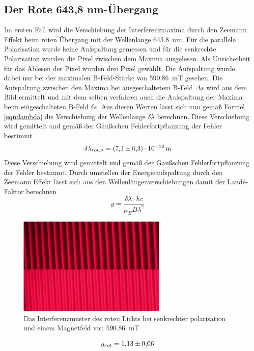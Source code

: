 \subsection{Der Rote 643,8 nm-Übergang}
Im ersten Fall wird die Verschiebung der Interferenzmaxima durch den Zeemann Effekt beim roten Übergang mit der Wellenlänge \SI{643,8}{\nano\metre}.
Für die parallele Polarisation wurde keine Aufspaltung gemessen und für die senkrechte Polarisation wurden die Pixel zwischen dem Maxima ausgelesen.
Als Unsicherheit für das Ablesen der Pixel wurden drei Pixel gewählt.
Die Aufspaltung wurde dabei nur bei der maximalen B-Feld-Stärke von \SI{590,86}{\milli\tesla} gesehen.
Die Aufspaltung zwischen den Maxima bei ausgeschaltetem B-Feld $\Delta s$ wird aus dem Bild ermittelt und mit dem selben verfahren auch die Aufspaltung der Maxima beim eingeschalteten B-Feld $\delta s$.
Aus diesen Werten lässt sich nun gemäß Formel \ref{eqn:lambda} die Verschiebung der Wellenlänge $\delta \lambda$ berechnen.
Diese Verschiebung wird gemittelt und gemäß der Gaußschen Fehlerfortpflanzung der Fehler bestimmt.
\begin{equation*}
    \delta \lambda_{rot,\sigma} = \SI{7.1(3)d-12}{\metre}
\end{equation*}
Diese Verschiebung wird gemittelt und gemäß der Gaußschen Fehlerfortpflanzung der Fehler bestimmt.
Durch umstellen der Energieaufspaltung durch den Zeemann Effekt lässt sich aus den Wellenlängenverschiebungen damit der Landé-Faktor berechnen
\begin{equation*}
    g = \frac{\delta \lambda \cdot h c}{\mu_B B \lambda^2}
\end{equation*}
\begin{figure}
    \center
    \includegraphics[width=0.65\textwidth]{bilder/bearbeitet/rot_senk.jpg}
    \caption{Das Interferenzmuster des roten Lichts bei senkrechter polarisation und einem Magnetfeld von \SI{590,86}{\milli\tesla}}
    \label{fig:rot_senk}
\end{figure}
\begin{equation*}
    g_{rot} = \num{1.13+-0.06}
\end{equation*}

